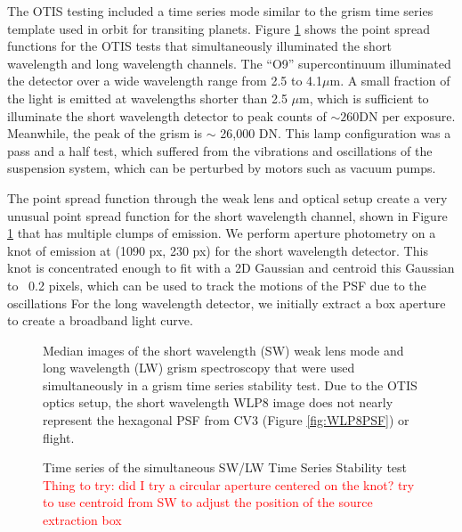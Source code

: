 \documentclass{aastex62}
\begin{document}
{The OTIS testing included a time series mode similar to the grism time series template used in orbit for transiting planets.
Figure \ref{fig:otisPSFs} shows the point spread functions for the OTIS tests that simultaneously illuminated the short wavelength and long wavelength channels.
The ``O9'' supercontinuum illuminated the detector over a wide wavelength range from 2.5 to 4.1$\mu$m.
A small fraction of the light is emitted at wavelengths shorter than 2.5 $\mu$m, which is sufficient to illuminate the short wavelength detector to peak counts of $\sim 260$DN per exposure.
Meanwhile, the peak of the grism is $\sim$ 26,000 DN.
This lamp configuration was a pass and a half test, which suffered from the vibrations and oscillations of the suspension system, which can be perturbed by motors such as vacuum pumps.

The point spread function through the weak lens and optical setup create a very unusual point spread function for the short wavelength channel, shown in Figure \ref{fig:otisPSFs} that has multiple clumps of emission.
We perform aperture photometry on a knot of emission at (1090 px, 230 px) for the short wavelength detector.
This knot is concentrated enough to fit with a 2D Gaussian and centroid this Gaussian to ~0.2 pixels, which can be used to track the motions of the PSF due to the oscillations
For the long wavelength detector, we initially extract a box aperture to create a broadband light curve.


\begin{figure}
\caption{Median images of the short wavelength (SW) weak lens mode and long wavelength (LW) grism spectroscopy that were used simultaneously in a grism time series stability test.
Due to the OTIS optics setup, the short wavelength WLP8 image does not nearly represent the hexagonal PSF from CV3 (Figure \ref{fig:WLP8PSF}) or flight.
}\label{fig:otisPSFs}
\end{figure}

\begin{figure}
\caption{Time series of the simultaneous SW/LW Time Series Stability test
\textcolor{red}{Thing to try: did I try a circular aperture centered on the knot? try to use centroid from SW to adjust the position of the source extraction box}
}\label{fig:otisLWSWtser}
\end{figure}


}
\end{document}
